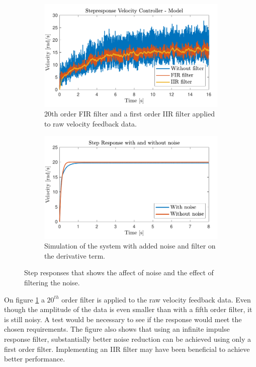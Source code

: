 \documentclass[../../main.tex]{subfiles}
\begin{document}
\begin{figure}[H]
     \centering
     \begin{subfigure}[b]{0.49\textwidth}
         \centering
    \includegraphics[width=\textwidth]{Sections/Miscellaneous/Images/FilteredStepRespons20Order.pdf}
    \caption{20th order FIR filter and a first order IIR filter applied to raw velocity feedback data.}
    \label{fig:FilteredStepRespons20Order}
     \end{subfigure}
     \hfill
     \begin{subfigure}[b]{0.49\textwidth}
         \centering
         \includegraphics[width=\textwidth]{Sections/Miscellaneous/Images/StepResponsAddedNoiseAndFilter.pdf}
         \caption{Simulation of the system with added noise and filter on the derivative term.}
         \label{fig:StepResponsAddedNoiseAndFilter}
     \end{subfigure}
        \caption{Step responses that shows the affect of noise and the effect of filtering the noise.}
        \label{fig:FilterDiskussionImplementedFilter20}
\end{figure}
On figure \ref{fig:FilteredStepRespons20Order} a $20^{th}$ order filter is applied to the raw velocity feedback data. Even though the amplitude of the data is even smaller than with a fifth order filter, it is still noisy. A test would be necessary to see if the response would meet the chosen requirements. The figure also shows that using an infinite impulse response filter, substantially better noise reduction can be achieved using only a first order filter. Implementing an IIR filter may have been beneficial to achieve better performance.
\end{document}
